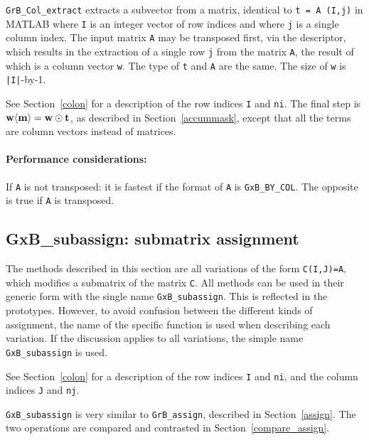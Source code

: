 \documentclass[12pt]{article}
\begin{document}
\verb'GrB_Col_extract' extracts a subvector from a matrix, identical to
\verb't = A (I,j)' in MATLAB where \verb'I' is an integer vector of row indices
and where \verb'j' is a single column index.  The input matrix \verb'A' may be
transposed first, via the descriptor, which results in the extraction of a
single row \verb'j' from the matrix \verb'A', the result of which is a column
vector \verb'w'.  The type of \verb't' and \verb'A' are the same.
The size of \verb'w' is \verb'|I|'-by-1.

See Section~\ref{colon} for a description of the row indices
\verb'I' and \verb'ni'.
The final step is ${\bf w \langle m
\rangle  = w \odot t}$, as described in Section~\ref{accummask}, except that
all the terms are column vectors instead of matrices.

\paragraph{\bf Performance considerations:} %
If \verb'A' is not transposed: it is fastest if the format of \verb'A' is
\verb'GxB_BY_COL'.  The opposite is true if \verb'A' is transposed.

\newpage
\subsection{{\sf GxB\_subassign:} submatrix assignment} %
\label{subassign}

The methods described in this section are all variations of the form
\verb'C(I,J)=A', which modifies a submatrix of the matrix \verb'C'.  All
methods can be used in their generic form with the single name
\verb'GxB_subassign'.  This is reflected in the prototypes.  However, to avoid
confusion between the different kinds of assignment, the name of the specific
function is used when describing each variation.  If the discussion applies to
all variations, the simple name \verb'GxB_subassign' is used.

See Section~\ref{colon} for a description of the row indices
\verb'I' and \verb'ni', and the column indices
\verb'J' and \verb'nj'.

\verb'GxB_subassign' is very similar to \verb'GrB_assign', described in
Section~\ref{assign}.  The two operations are compared and contrasted in
Section~\ref{compare_assign}.
\end{document}

